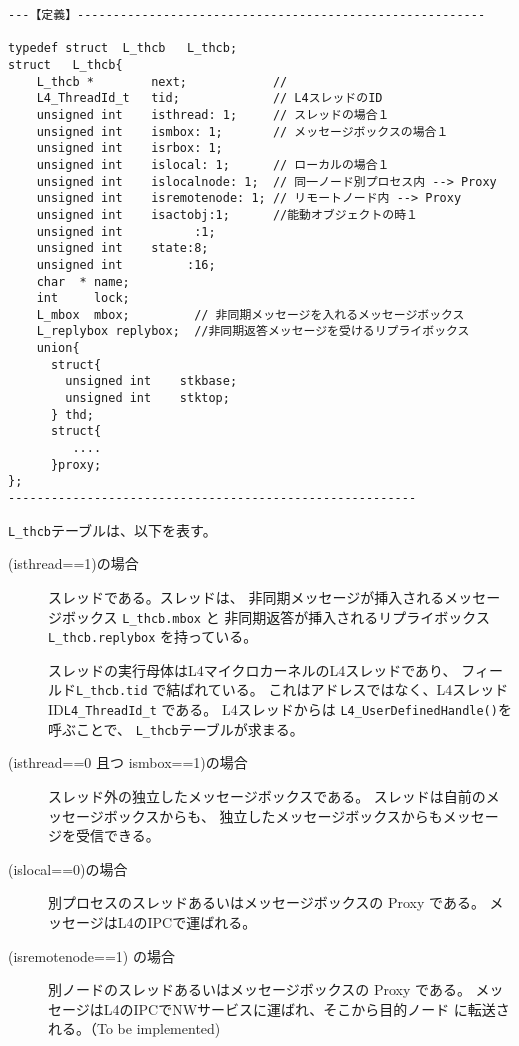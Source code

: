 \begin{verbatim}
---【定義】---------------------------------------------------------

typedef struct  L_thcb   L_thcb;
struct   L_thcb{
    L_thcb *        next;            //
    L4_ThreadId_t   tid;             // L4スレッドのID
    unsigned int    isthread: 1;     // スレッドの場合１
    unsigned int    ismbox: 1;       // メッセージボックスの場合１
    unsigned int    isrbox: 1;
    unsigned int    islocal: 1;      // ローカルの場合１
    unsigned int    islocalnode: 1;  // 同一ノード別プロセス内 --> Proxy
    unsigned int    isremotenode: 1; // リモートノード内 --> Proxy
    unsigned int    isactobj:1;      //能動オブジェクトの時１
    unsigned int          :1;
    unsigned int    state:8;
    unsigned int         :16;
    char  * name;
    int     lock;
    L_mbox  mbox;         // 非同期メッセージを入れるメッセージボックス
    L_replybox replybox;  //非同期返答メッセージを受けるリプライボックス
    union{
      struct{
        unsigned int    stkbase;
        unsigned int    stktop;
      } thd;
      struct{
         ....
      }proxy;
};
---------------------------------------------------------
\end{verbatim}

\verb|L_thcb|テーブルは、以下を表す。

\begin{description}
\item[(isthread==1)の場合]
  スレッドである。スレッドは、
  非同期メッセージが挿入されるメッセージボックス \verb|L_thcb.mbox| と
  非同期返答が挿入されるリプライボックス \verb|L_thcb.replybox| を持っている。

  スレッドの実行母体はL4マイクロカーネルのL4スレッドであり、
  フィールド\verb|L_thcb.tid| で結ばれている。
  これはアドレスではなく、L4スレッドID\verb|L4_ThreadId_t| である。
  L4スレッドからは \verb|L4_UserDefinedHandle()|を呼ぶことで、
  \verb|L_thcb|テーブルが求まる。

\item[(isthread==0 且つ ismbox==1)の場合]
  スレッド外の独立したメッセージボックスである。
  スレッドは自前のメッセージボックスからも、
  独立したメッセージボックスからもメッセージを受信できる。

\item[(islocal==0)の場合]
   別プロセスのスレッドあるいはメッセージボックスの Proxy である。
   メッセージはL4のIPCで運ばれる。

\item[(isremotenode==1) の場合]
   別ノードのスレッドあるいはメッセージボックスの Proxy である。
   メッセージはL4のIPCでNWサービスに運ばれ、そこから目的ノード
   に転送される。（To be implemented)

\end{description}

